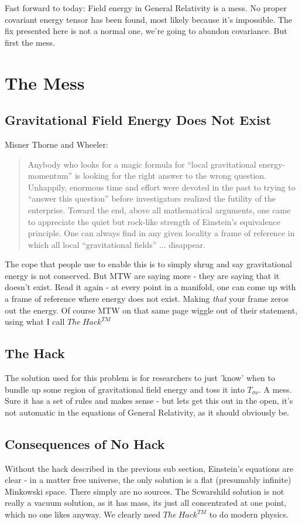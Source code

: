 \documentclass[../rzero]{subfiles}
\begin{document}
Fast forward to today: Field energy in General Relativity is a mess. No proper covariant energy tensor has been found, most likely because it's impossible. The fix presented here is not a normal one, we're going to abandon covariance. But first the mess.

\section{The Mess}
\subsection{Gravitational Field Energy Does Not Exist}
Misner Thorne and Wheeler\cite{Wheeler1973}:
   
   \begin{quotation}
   Anybody who looks for a magic formula for ``local gravitational energy-momentum'' is looking for the right answer to the wrong question. Unhappily, enormous time and effort were devoted in the past to trying to ``answer this question'' before investigators realized the futility of the enterprise. Toward the end, above all mathematical arguments, one came to appreciate the quiet but rock-like strength of Einstein's equivalence principle. One can always find in any given locality a frame  of reference in which all local ``gravitational fields'' ... disappear.
   \end{quotation}
   
 The cope that people use to enable this is to simply shrug and say gravitational energy is not conserved. But MTW are saying more - they are saying that it doesn't exist. Read it again - at every point in a manifold, one can come up with a frame of reference where energy does not exist. Making \textit{that} your frame  zeros out the energy. Of course MTW on that same page wiggle out of their statement, using what I call $The\ Hack^{TM}$
 
 \subsection{The Hack}
 The solution used for this problem is for researchers to just 'know' when to bundle up some region of gravitational field energy and toss it into $T_{\sigma \nu}$. A mess. Sure it has a set of rules and makes sense - but lets get this out in the open, it's not automatic in the equations of General Relativity, as it should obviously be.
 
 \subsection{Consequences of No Hack}
 Without the hack described in the previous sub section, Einstein's equations are clear - in a matter free universe, the only solution is a flat (presumably infinite) Minkowski space. There simply are no sources. The Scwarshild solution is not really a vacuum solution, as it has mass, its just all concentrated at one point, which no one likes anyway. 
 We clearly need $The\ Hack^{TM}$ to do modern physics.
 
\end{document}
